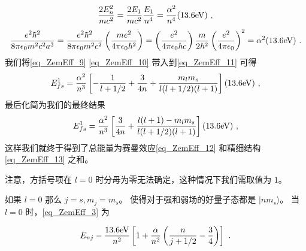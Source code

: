 \begin{equation}\label{eq_ZemEff_10}
\frac{2E_n^2}{mc^2}=\frac{2E_1}{mc^2}\frac{E_1}{n^4}=\frac{\alpha^2}{n^4}(13.6\rm{eV})~,
\end{equation}
\begin{equation}
\frac{e^2\hbar^2}{8\pi\epsilon_0m^2c^2a^3}=\frac{e^2\hbar^2}{8\pi\epsilon_0m^2c^2}\left(\frac{me^2}{4\pi\epsilon_0\hbar^2}\right)=\left(\frac{e^2}{4\pi\epsilon_0\hbar c}\right)\frac{m}{2\hbar^2}\left(\frac{e^2}{4\pi\epsilon_0}\right)^2=\alpha^2(13.6\rm{eV})~.
\end{equation}
我们将\autoref{eq_ZemEff_9} \autoref{eq_ZemEff_10} 带入到\autoref{eq_ZemEff_11} 可得
\begin{equation}\label{eq_ZemEff_13}
E_{fs}^1=\frac{\alpha^2}{n^3}\left[-\frac{1}{l+1/2}+\frac{3}{4n}+\frac{m_lm_s}{l(l+1/2)(l+1)}\right](13.6 \rm eV) ~,
\end{equation}
最后化简为我们的最终结果
\begin{equation}
E_{fs}^1=\frac{\alpha^2}{n^3}\left[\frac{3}{4n}+\frac{l(l+1)-m_lm_s}{l(l+1/2)(l+1)}\right](13.6 \rm eV)~,
\end{equation}
这样我们就终于得到了总能量为赛曼效应\autoref{eq_ZemEff_12} 和精细结构 \autoref{eq_ZemEff_13} 之和。

注意，方括号项在 $l=0$ 时分母为零无法确定，这种情况下我们需取值为 $1$。
\begin{example}{}
如果 $l=0$ 那么 $j=s,m_j=m_s$。 使得对于强和弱场的好量子态都是 $|nm_s\rangle$。 当 $l=0$ 时，\autoref{eq_ZemEff_3} 为

\begin{equation}
E_{nj}-\frac{13.6\rm{eV}}{n^2}\left[1+\frac{\alpha}{n^2}\left(\frac{n}{j+1/2}-\frac{3}{4}\right)\right]~.
\end{equation}

\end{example}

